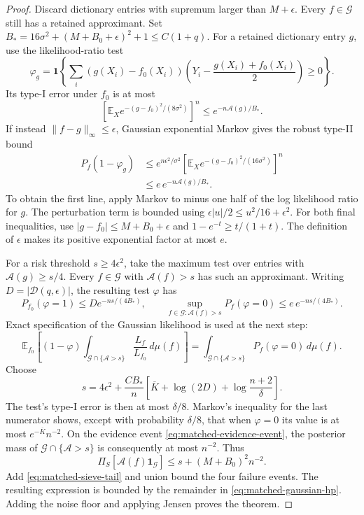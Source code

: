 \begin{proof}
Discard dictionary entries with supremum larger than $M+\epsilon$. Every $f\in\mathcal G$ still has a retained approximant. Set
$B_*=16\sigma^2+(M+B_0+\epsilon)^2+1\le C(1+q)$.
For a retained dictionary entry $g$, use the likelihood-ratio test
\[
 \varphi_g=\mathbf1\left\{
  \sum_i(g(X_i)-f_0(X_i))
          \left(Y_i-\frac{g(X_i)+f_0(X_i)}2\right)\ge0\right\}.
\]
Its type-I error under $f_0$ is at most
\[
 \left[\mathbb E_Xe^{-(g-f_0)^2/(8\sigma^2)}\right]^n
                    \le e^{-n\mathcal A(g)/B_*}.
\]
If instead $\|f-g\|_\infty\le\epsilon$, Gaussian exponential Markov gives the robust type-II bound
\begin{align*}
 P_f(1-\varphi_g)
 &\le e^{n\epsilon^2/\sigma^2}
       \left[\mathbb E_Xe^{-(g-f_0)^2/(16\sigma^2)}\right]^n\\
 &\le e\,e^{-n\mathcal A(g)/B_*}.
\end{align*}
To obtain the first line, apply Markov to minus one half of the log likelihood ratio for $g$. The perturbation term is bounded using
$\epsilon|u|/2\le u^2/16+\epsilon^2$.
For both final inequalities, use $|g-f_0|\le M+B_0+\epsilon$ and
$1-e^{-t}\ge t/(1+t)$. The definition of $\epsilon$ makes its positive exponential factor at most $e$.

For a risk threshold $s\ge4\epsilon^2$, take the maximum test over entries with $\mathcal A(g)\ge s/4$. Every $f\in\mathcal G$ with $\mathcal A(f)>s$ has such an approximant. Writing $D=|\mathcal D(q,\epsilon)|$, the resulting test $\varphi$ has
\[
 P_{f_0}(\varphi=1)\le D e^{-ns/(4B_*)},\qquad
 \sup_{f\in\mathcal G:\mathcal A(f)>s}P_f(\varphi=0)
                 \le e\,e^{-ns/(4B_*)}.
\]
Exact specification of the Gaussian likelihood is used at the next step:
\[
 \mathbb E_{f_0}\left[(1-\varphi)
       \int_{\mathcal G\cap\{\mathcal A>s\}}
                        \frac{L_f}{L_{f_0}}\,d\mu(f)\right]
 =\int_{\mathcal G\cap\{\mathcal A>s\}}P_f(\varphi=0)\,d\mu(f).
\]
Choose
\[
 s=4\epsilon^2+\frac{C B_*}{n}
           \left[\overline K+\log(2D)+\log\frac{n+2}{\delta}\right].
\]
The test's type-I error is then at most $\delta/8$. Markov's inequality for the last numerator shows, except with probability $\delta/8$, that when $\varphi=0$ its value is at most $e^{-\overline K}n^{-2}$. On the evidence event \eqref{eq:matched-evidence-event}, the posterior mass of $\mathcal G\cap\{\mathcal A>s\}$ is consequently at most $n^{-2}$. Thus
\[
 \Pi_S[\mathcal A(f)\mathbf1_{\mathcal G}]
                     \le s+(M+B_0)^2n^{-2}.
\]
Add \eqref{eq:matched-sieve-tail} and union bound the four failure events. The resulting expression is bounded by the remainder in \eqref{eq:matched-gaussian-hp}. Adding the noise floor and applying Jensen proves the theorem.
\end{proof}

